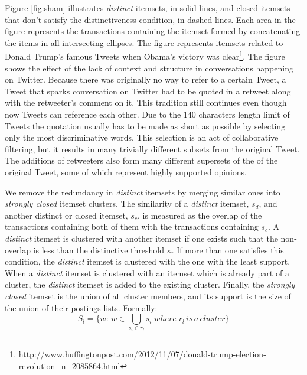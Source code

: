 \documentclass{sig-alternate}
\begin{document}
Figure \ref{fig:sham} illustrates \emph{distinct} itemsets, in solid lines, and closed itemsets that don't satisfy the distinctiveness condition, in dashed lines. Each area in the figure represents the transactions containing the itemset formed by concatenating the items in all intersecting ellipses.  
The figure represents itemsets related to Donald Trump's famous 
Tweets when Obama's victory was clear\footnote{http://www.huffingtonpost.com/2012/11/07/donald-trump-election-revolution\_n\_2085864.html}.  The figure shows the effect of the lack of context and structure in conversations happening on Twitter. Because there was originally no way to refer to a certain Tweet, a Tweet that sparks conversation on Twitter had  to be quoted in a retweet along with the retweeter's comment on it. This tradition still continues even though now Tweets can reference each other. 
Due to the 140 characters length limit of Tweets the quotation usually has to be made as short as possible by selecting only the most discriminative words. This selection is an act of collaborative filtering, but it results in many trivially different subsets from the original Tweet. The additions of retweeters also form many different supersets of the of the original Tweet, some of which represent highly supported opinions. 

We remove the redundancy in \emph{distinct} itemsets by merging similar ones into \emph{strongly closed} itemset clusters. The similarity of a \emph{distinct} itemset, $s_d$, and another distinct or closed itemset, $s_c$, is measured as the overlap of the transactions containing both of them with the transactions containing $s_c$.  A \emph{distinct} itemset is clustered with another itemset if one exists such that the non-overlap is less than the distinctive threshold $\kappa$. If more than one satisfies this condition, the  \emph{distinct} itemset is clustered with the one with the least support. When  a \emph{distinct} itemset is clustered with an itemset which is already part of a cluster, the \emph{distinct} itemset is added to the existing cluster. Finally, the \emph{strongly closed} itemset is the 
union of all cluster members, and its support is the size of the union of their postings lists. Formally:
\begin{equation}S_l = \{w:\, w \in \bigcup_{s_i \in r_l}{s_i} \; where \; r_l \, is \, a\, cluster\}\end{equation}
\end{document}
